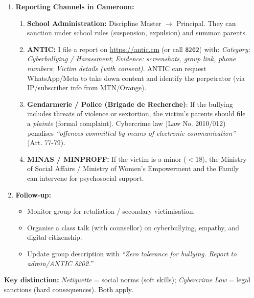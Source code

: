 \documentclass[11pt]{article}
\begin{document}
\begin{exoresolu}
\begin{enumerate}
\begin{itemize}
                  \item \textbf{Rule 4: Verify before sharing} — the bully created/shares doctored images (disinformation + harassment).
                  \item \textbf{Rule 5: Respect privacy} — using the victim's image without consent.
                  \item \textbf{Rule 7: Disagree constructively} — this isn't disagreement; it's targeted abuse.
                  \item \textbf{Context:} A school WhatsApp group is a \textit{semi-formal educational space}; such behaviour violates school regulations and Cameroonian law.
              \end{itemize}
        \item \textbf{Reporting Channels in Cameroon:}
              \begin{enumerate}
                  \item \textbf{School Administration:} Discipline Master $\rightarrow$ Principal. They can sanction under school rules (suspension, expulsion) and summon parents.
                  \item \textbf{ANTIC:} I file a report on \url{https://antic.cm} (or call \texttt{8202}) with: \textit{Category: Cyberbullying / Harassment}; \textit{Evidence: screenshots, group link, phone numbers}; \textit{Victim details (with consent)}. ANTIC can request WhatsApp/Meta to take down content and identify the perpetrator (via IP/subscriber info from MTN/Orange).
                  \item \textbf{Gendarmerie / Police (Brigade de Recherche)}: If the bullying includes threats of violence or sextortion, the victim's parents should file a \textit{plainte} (formal complaint). Cybercrime law (Law No. 2010/012) penalises \textit{``offences committed by means of electronic communication''} (Art. 77-79).
                  \item \textbf{MINAS / MINPROFF:} If the victim is a minor ($<18$), the Ministry of Social Affairs / Ministry of Women's Empowerment and the Family can intervene for psychosocial support.
              \end{enumerate}
        \item \textbf{Follow-up:}
              \begin{itemize}
                  \item Monitor group for retaliation / secondary victimisation.
                  \item Organise a class talk (with counsellor) on cyberbullying, empathy, and digital citizenship.
                  \item Update group description with \textit{``Zero tolerance for bullying. Report to admin/ANTIC 8202.''}
              \end{itemize}
    \end{enumerate}
    \textbf{Key distinction:} \textit{Netiquette} = social norms (soft skills); \textit{Cybercrime Law} = legal sanctions (hard consequences). Both apply.
\end{exoresolu}
\end{document}
